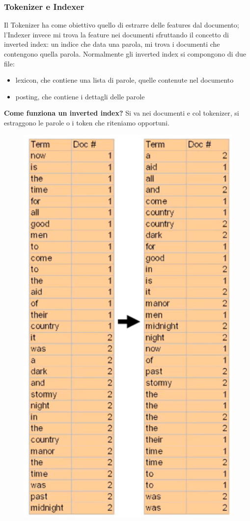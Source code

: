 \subsubsection{Tokenizer e Indexer} 
Il Tokenizer ha come obiettivo quello di estrarre delle features dal documento; l'Indexer invece mi trova la feature nei documenti sfruttando il concetto di inverted index: un indice che data una parola, mi trova i documenti che contengono quella parola. Normalmente gli inverted index si compongono di due file: 
\begin{itemize}
    \item lexicon, che contiene una lista di parole, quelle contenute nel documento
    \item posting, che contiene i dettagli delle parole
\end{itemize}
\textbf{Come funziona un inverted index?} Si va nei documenti e col tokenizer, si estraggono le parole o i token che riteniamo opportuni. 
\\
\begin{figure}[th]
    \centering
    \includegraphics[scale=0.5]{Text Analysis/img/tokenizer.png}
\end{figure}
